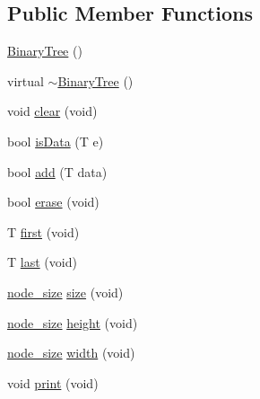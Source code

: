 \subsection*{Public Member Functions}
\begin{DoxyCompactItemize}
\item 
\hyperlink{class_binary_tree_a9202cce23960faf8f647c6765decccd4}{Binary\+Tree} ()
\item 
virtual \hyperlink{class_binary_tree_a390c319c0b28b958463851119edb8af3}{$\sim$\+Binary\+Tree} ()
\item 
void \hyperlink{class_binary_tree_a83692b11e275f9843f74218aca54f939}{clear} (void)
\item 
bool \hyperlink{class_binary_tree_a9e4e37cf93a96c3177d8bf00ee1ba664}{is\+Data} (T e)
\item 
bool \hyperlink{class_binary_tree_a5d45e29e4a1fae4a7c5e9810b5d04475}{add} (T data)
\item 
bool \hyperlink{class_binary_tree_a389dc4035bb6b6f1d8ca160cc487955c}{erase} (void)
\item 
T \hyperlink{class_binary_tree_ab428c078bc0d60bc99ebd6eebfb5bd89}{first} (void)
\item 
T \hyperlink{class_binary_tree_a1328c1a57e0e5e0a18440a95d3e10e89}{last} (void)
\item 
\hyperlink{class_binary_tree_a6c9d1d57bf13ca658fe926a0c7255ecf}{node\+\_\+size} \hyperlink{class_binary_tree_aa94faf0b38b03477896a2e317035ce4b}{size} (void)
\item 
\hyperlink{class_binary_tree_a6c9d1d57bf13ca658fe926a0c7255ecf}{node\+\_\+size} \hyperlink{class_binary_tree_a8db912740f7cbedb56799a59652ff80e}{height} (void)
\item 
\hyperlink{class_binary_tree_a6c9d1d57bf13ca658fe926a0c7255ecf}{node\+\_\+size} \hyperlink{class_binary_tree_ac1ac7f0c60b0ada90f726ed4b5b391cd}{width} (void)
\item 
void \hyperlink{class_binary_tree_a67e010089a20bbcc7bd282dd0759167d}{print} (void)
\end{DoxyCompactItemize}
